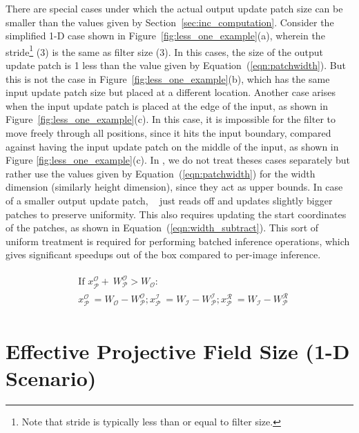 There are special cases under which the actual output update patch size can be smaller than the values given by Section~\ref{sec:inc_computation}. Consider the simplified 1-D case shown in Figure~\ref{fig:less_one_example}(a), wherein the stride\footnote{Note that stride is typically less than or equal to filter size.} (3) is the same as filter size (3). In this cases, the size of the output update patch is 1 less than the value given by Equation~(\ref{eqn:patchwidth}). But this is not the case in Figure~\ref{fig:less_one_example}(b), which has the same input update patch size but placed at a different location.
Another case arises when the input update patch is placed at the edge of the input, as shown in Figure~\ref{fig:less_one_example}(c). In this case, it is impossible for the filter to move freely through all positions, since it hits the input boundary, compared against having the input update patch on the middle of the input, as shown in Figure \ref{fig:less_one_example}(c). In \system, we do not treat theses cases separately but rather use the values given by Equation~(\ref{eqn:patchwidth}) for the width dimension (similarly height dimension), since they act as upper bounds. In case of a smaller output update patch, \system~ just reads off and updates slightly bigger patches to preserve uniformity. This also requires updating the start coordinates of the patches, as shown in Equation~(\ref{eqn:width_subtract}). This sort of uniform treatment is required for performing batched inference operations, which gives significant speedups out of the box compared to per-image inference.

\vspace{-4mm}
\begin{align}
\begin{split}
\label{eqn:width_subtract}
&\text{If~} x^\mathcal{O}_\mathcal{P} + ~W^\mathcal{O}_\mathcal{P} > W_{\mathcal{O}}:\\
&x^\mathcal{O}_\mathcal{P} ~ =  W_{\mathcal{O}} - W^\mathcal{O}_\mathcal{P}; 
x^\mathcal{I}_\mathcal{P} ~ = W_{\mathcal{I}} - W^\mathcal{I}_\mathcal{P}; 
x^\mathcal{R}_\mathcal{P} ~ = W_{\mathcal{I}} - W^\mathcal{R}_\mathcal{P}
\end{split}
\end{align}





\section{Effective Projective Field Size (1-D Scenario)}

